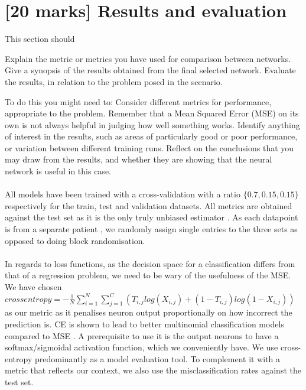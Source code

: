 \documentclass[11pt,a4paper]{article}
\begin{document}
\section{[20 marks] Results and evaluation}
\label{sec:results}
This section should
\begin{outline}
  \1 Explain the metric or metrics you have used for comparison between networks.
  \1 Give a synopsis of the results obtained from the final selected network.
  \1 Evaluate the results, in relation to the problem posed in the scenario. 
\end{outline}
\begin{outline}
To do this you might need to:
  \1 Consider different metrics for performance, appropriate to the problem. Remember that a Mean Squared Error (MSE) on its own is not always helpful in judging how well something works.
  \1 Identify anything of interest in the results, such as areas of particularly good or poor performance, or variation between different training runs.
  \1 Reflect on the conclusions that you may draw from the results, and whether they are showing that the neural network is useful in this case.
\end{outline}

\paragraph{}
All models have been trained with a cross-validation with a ratio \(\{0.7, 0.15,0.15\}\) respectively for the train, test and validation datasets. All metrics are obtained against the test set as it is the only truly unbiased estimator \autocite[p222]{hastie2009elements}. As each datapoint is from a separate patient \autocite{MLforCardio}, we randomly assign single entries to the three sets as opposed to doing block randomisation.

\paragraph{}
In regards to loss functions, as the decision space for a classification differs from that of a regression problem, we need to be wary of the usefulness of the MSE. We have chosen \(crossentropy = -\frac{1}{N}\sum_{i=1}^N\sum_{j=1}^C(T_{i,j}log(X_{i,j})+(1 - T_{i,j})log(1-X_{i,j}))\) as our metric as it penalises neuron output proportionally on how incorrect the prediction is. CE is shown to lead to better multinomial classification models compared to MSE \autocite{Golik2013CrossentropyVS}. A prerequisite to use it is the output neurons to have a softmax/sigmoidal activation function, which we conveniently have. We use cross-entropy predominantly as a model evaluation tool. To complement it with a metric that reflects our context, we also use the misclassification rates against the test set.
\end{document}
